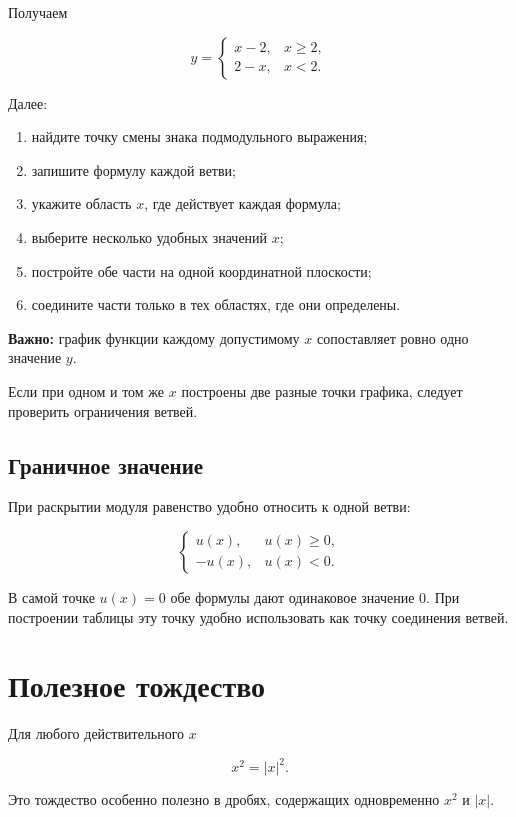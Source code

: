 \documentclass[a4paper,12pt]{article}
\newcommand{\key}[1]{\textcolor{darkaccent}{\textbf{#1}}}
\begin{document}
Получаем

\[
y=
\begin{cases}
x-2, & x\ge2,\\
2-x, & x<2.
\end{cases}
\]

Далее:

\begin{enumerate}
\item найдите точку смены знака подмодульного выражения;
\item запишите формулу каждой ветви;
\item укажите область \(x\), где действует каждая формула;
\item выберите несколько удобных значений \(x\);
\item постройте обе части на одной координатной плоскости;
\item соедините части только в тех областях, где они определены.
\end{enumerate}

\key{Важно:}
график функции каждому допустимому \(x\) сопоставляет ровно одно значение \(y\).

Если при одном и том же \(x\) построены две разные точки графика, следует проверить ограничения ветвей.

\subsection{Граничное значение}

При раскрытии модуля равенство удобно относить к одной ветви:

\[
\begin{cases}
u(x), & u(x)\ge0,\\
-u(x), & u(x)<0.
\end{cases}
\]

В самой точке \(u(x)=0\) обе формулы дают одинаковое значение \(0\).
При построении таблицы эту точку удобно использовать как точку соединения ветвей.


\section{Полезное тождество}

Для любого действительного \(x\)

\[
x^2=|x|^2.
\]

Это тождество особенно полезно в дробях, содержащих одновременно \(x^2\) и \(|x|\).
\end{document}
